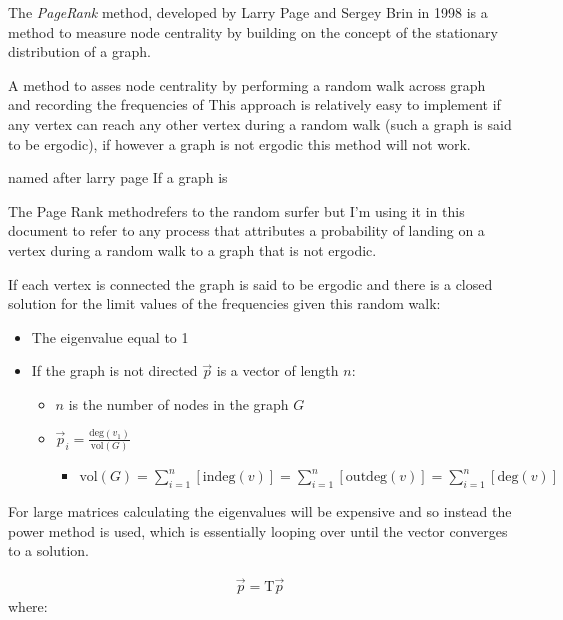 \documentclass[11pt]{article}
\begin{document}
The \emph{PageRank} method, developed by Larry Page and Sergey Brin in 1998 \cite{larrypageAnatomyLargescaleHypertextual1998} is a method to measure node centrality by building on the concept of the stationary distribution of a graph.


A method to asses node centrality by performing a random walk across graph and
recording the frequencies of
This approach is relatively easy to implement if any vertex can reach any other
vertex during a random walk (such a graph is said to be ergodic), if however a
graph is not ergodic this method will not work.

named after larry page \cite{GooglePressCenter2001}
If a graph is

The Page Rank methodrefers to the random surfer but I'm using it in this document to refer to any process that attributes a probability of landing on a vertex during a random walk to a graph that is not ergodic.

If each vertex is connected the graph is said to be ergodic and there is a closed solution for the limit values of the frequencies given this random walk:

\begin{itemize}
\item The eigenvalue equal to 1
\item If the graph is not directed \(\vec{p}\) is a vector of length \(n\):
\begin{itemize}
\item \(n\) is the number of nodes in the graph \(G\)
\item \(\vec{p}_{i} = \frac{\mathrm{deg}(v_{1})}{\mathrm{vol}(G)}\)
\begin{itemize}
\item \(\mathrm{vol}(G) = \sum^{n}_{i = 1} \left[ \mathrm{indeg}(v) \right] = \sum^{n}_{i = 1} \left[ \mathrm{outdeg}(v) \right ] = \sum^{n}_{i = 1} \left[ \mathrm{deg}(v) \right]\)
\end{itemize}
\end{itemize}
\end{itemize}


For large matrices calculating the eigenvalues will be expensive and so instead the power method is used, which is essentially looping over until the vector converges to a solution.

\begin{align}
\vec{p} = \mathrm{T}\vec{p} \label{eq:pageRank-Method}
\end{align}
where:
\end{document}
